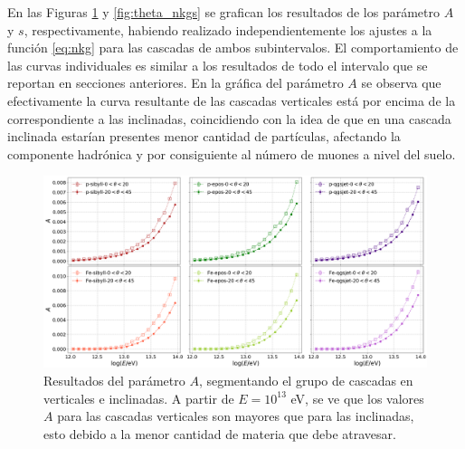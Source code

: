 \documentclass[12pt,letterpaper]{report}
\begin{document}
	En las Figuras \ref{fig:theta_nkgA} y \ref{fig:theta_nkgs} se grafican los resultados de los par\'ametro $A$ y $s$, respectivamente, habiendo realizado independientemente los ajustes a la funci\'on \ref{eq:nkg} para las cascadas de ambos subintervalos. El comportamiento de las curvas individuales es similar a los resultados de todo el intervalo que se reportan en secciones anteriores. En la gr\'afica del par\'ametro $A$ se observa que efectivamente la curva resultante de las cascadas verticales est\'a por encima de la correspondiente a las inclinadas, coincidiendo con la idea de que en una cascada inclinada estar\'ian presentes menor cantidad de part\'iculas, afectando la componente hadr\'onica y por consiguiente al n\'umero de muones a nivel del suelo.
	\begin{figure} [h]
		\includegraphics[width=\textwidth]{Figuras/theta_nkgA}
		\caption{Resultados del par\'ametro $A$, segmentando el grupo de cascadas en verticales e inclinadas. A partir de $E=10^{13}$ eV, se ve que los valores $A$ para las cascadas verticales son mayores que para las inclinadas, esto debido a la menor cantidad de materia que debe atravesar.}
		\label{fig:theta_nkgA}
		\end{figure}
	
\end{document}

